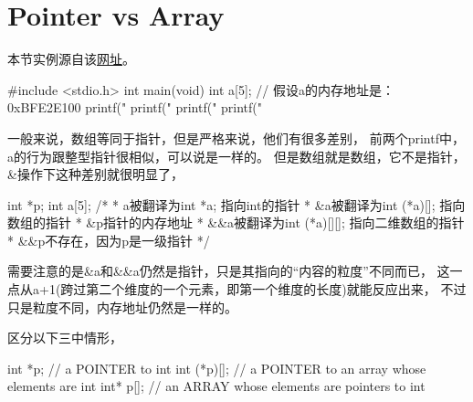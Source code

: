 ﻿\section[Pointer vs Array]{Pointer vs Array}
本节实例源自该\href{http://coolshell.cn/articles/5761.html}{网址}。

\begin{cppcode}
#include <stdio.h>
int main(void)
{
  int a[5];  // 假设a的内存地址是：0xBFE2E100
  printf("%
  printf("%
  printf("%
  printf("%
}
\end{cppcode}

一般来说，数组等同于指针，但是严格来说，他们有很多差别，
前两个printf中，a的行为跟整型指针很相似，可以说是一样的。
但是数组就是数组，它不是指针，\&操作下这种差别就很明显了，

\begin{cppcode}
int *p;
int a[5];
/*
 * a被翻译为int *a; 指向int的指针
 * &a被翻译为int (*a)[]; 指向数组的指针
 * &p指针的内存地址
 * &&a被翻译为int (*a)[][]; 指向二维数组的指针
 * &&p不存在，因为p是一级指针
 */
\end{cppcode}

需要注意的是\&a和\&\&a仍然是指针，只是其指向的“内容的粒度”不同而已，
这一点从a+1(跨过第二个维度的一个元素，即第一个维度的长度)就能反应出来，
不过只是粒度不同，内存地址仍然是一样的。

区分以下三中情形，

\begin{cppcode}
int *p;
// a POINTER to int
int (*p)[];
// a POINTER to an array whose elements are int
int* p[];
// an ARRAY whose elements are pointers to int
\end{cppcode}